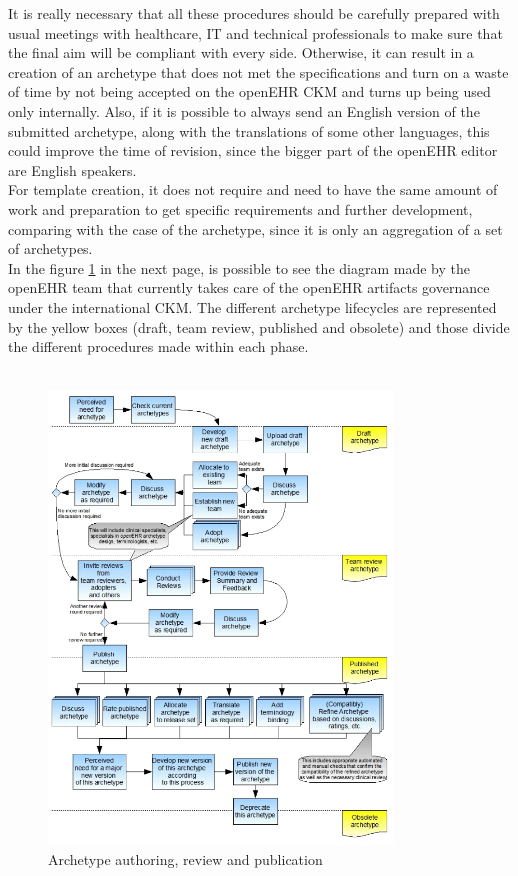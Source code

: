 \documentclass[mim_thesis.tex]{subfiles}
\begin{document}
It is really necessary that all these procedures should be carefully prepared with usual meetings with healthcare, IT and technical professionals to make sure that the final aim will be compliant with every side. Otherwise, it can result in a creation of an archetype that does not met the specifications and turn on a waste of time by not being accepted on the openEHR CKM and turns up being used only internally. Also, if it is possible to always send an English version of the submitted archetype, along with the translations of some other languages, this could improve the time of revision, since the bigger part of the openEHR editor are English speakers. \\

For template creation, it does not require and need to have the same amount of work and preparation to get specific requirements and further development, comparing with the case of the archetype, since it is only an aggregation of a set of archetypes. \\

In the figure \ref{fig:arch_auth} in the next page, is possible to see the diagram made by the openEHR team \citep{Leslie2008} that currently takes care of the openEHR artifacts governance under the international CKM. The different archetype lifecycles are represented by the yellow boxes (draft, team review, published and obsolete) and those divide the different procedures made within each phase. \\

\vfill
~

\begin{figure}[H]
	\centering
    \includegraphics[width=0.815\textwidth]{img/arch_auth.PNG}
	\caption{Archetype authoring, review and publication \citep{Leslie2008}}
	\label{fig:arch_auth}
\end{figure}
\end{document}
